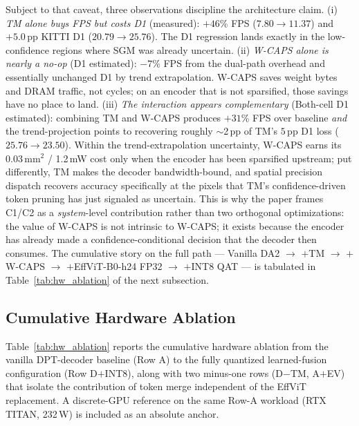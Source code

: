 \documentclass[journal]{IEEEtran}
\begin{document}
Subject to that caveat, three observations discipline the architecture claim. (i) \emph{TM alone buys FPS but costs D1} (measured): $+46$\% FPS ($7.80 \to 11.37$) and $+5.0$\,pp KITTI D1 ($20.79 \to 25.76$). The D1 regression lands exactly in the low-confidence regions where SGM was already uncertain. (ii) \emph{W-CAPS alone is nearly a no-op} (D1 estimated): $-7$\% FPS from the dual-path overhead and essentially unchanged D1 by trend extrapolation. W-CAPS saves weight bytes and DRAM traffic, not cycles; on an encoder that is not sparsified, those savings have no place to land. (iii) \emph{The interaction appears complementary} (Both-cell D1 estimated): combining TM and W-CAPS produces $+31$\% FPS over baseline \emph{and} the trend-projection points to recovering roughly $\sim$2\,pp of TM's $5$\,pp D1 loss ($25.76 \to 23.50$). Within the trend-extrapolation uncertainty, W-CAPS earns its 0.03\,mm$^2$ / 1.2\,mW cost only when the encoder has been sparsified upstream; put differently, TM makes the decoder bandwidth-bound, and spatial precision dispatch recovers accuracy specifically at the pixels that TM's confidence-driven token pruning has just signaled as uncertain. This is why the paper frames C1/C2 as a \emph{system}-level contribution rather than two orthogonal optimizations: the value of W-CAPS is not intrinsic to W-CAPS; it exists because the encoder has already made a confidence-conditional decision that the decoder then consumes. The cumulative story on the full path --- Vanilla DA2 $\to$ $+$TM $\to$ $+$W-CAPS $\to$ $+$EffViT-B0-h24 FP32 $\to$ $+$INT8 QAT --- is tabulated in Table~\ref{tab:hw_ablation} of the next subsection.

\subsection{Cumulative Hardware Ablation}
\label{sec:hw_cumulative}

Table~\ref{tab:hw_ablation} reports the cumulative hardware ablation from the vanilla DPT-decoder baseline (Row A) to the fully quantized learned-fusion configuration (Row D$+$INT8), along with two minus-one rows (D$-$TM, A$+$EV) that isolate the contribution of token merge independent of the EffViT replacement. A discrete-GPU reference on the same Row-A workload (RTX TITAN, 232\,W) is included as an absolute anchor.


\end{document}
